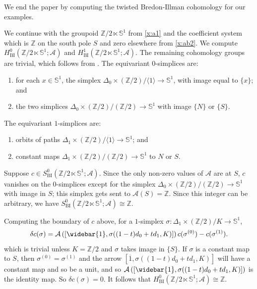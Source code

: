 \documentclass[12pt,reqno]{amsart}
\newcommand{\printname}[1]{}
\renewcommand{\printname}[1]
	{{\color{brown}{\makebox[0pt]{\hspace{-1in}\raisebox{8pt}{\tiny #1}}}}}
\newcommand{\labell}[1]{\label{#1} \printname{#1}}
\newcommand{\zed}{\ensuremath{\mathbb Z}}
\newcommand{\calA}{{\mathcal{A}}}
\renewcommand{\SS}{{\mathbb{S}}} %
\newcommand{\ZZ}{{\mathbb{Z}}}  %
\theoremstyle{plain}
\theoremstyle{definition}
\newenvironment{example}
		{\pushQED{\qed}\renewcommand{\qedsymbol}{$/\!\!/$}\examplex}
		{\popQED\endexamplex}
\newcommand{\BI}{{\operatorname{BI}}} %
\begin{document}
    We end the paper by computing the twisted Bredon-Illman cohomology for our examples.
    
    \begin{example}[{\bf Groupoid A}]\labell{x:a3}
        We continue with the groupoid $\ZZ/2 \ltimes \SS^1$ from \cref{x:a1} and the coefficient system which is $\zed$ on the south pole $S$ and zero elsewhere from \cref{x:ab2}.  We compute $H_\BI^0(\ZZ/2\ltimes\SS^1;\calA)$ and $H_\BI^1(\ZZ/2\ltimes\SS^1;\calA)$.  The remaining cohomology groups are trivial, which follows from \cite[Theorem 7.3]{MuMu}. 
        The equivariant $0$-simplices are:
        \begin{enumerate}
            \item for each $x\in\SS^1$, the simplex $\Delta_0\times(\ZZ/2)/\langle1\rangle\to\SS^1$, with image equal to $\{x\}$; and
            \item the two simplices $\Delta_0\times(\ZZ/2)/(\ZZ/2)\to\SS^1$ with image $\{N\}$ or $\{S\}$.
        \end{enumerate}

        The equivariant $1$-simplices are:
        \begin{enumerate}
            \item orbits of paths $\Delta_1\times(\ZZ/2)/\langle1\rangle\to\SS^1$; and
            \item constant maps $\Delta_1\times(\ZZ/2)/(\ZZ/2)\to\SS^1$ to $N$ or $S$.
        \end{enumerate}

        Suppose $c\in S^0_\BI(\ZZ/2\ltimes\SS^1;\calA)$.  Since the only non-zero values of $\calA$ are at $S$,  $c$ vanishes on the $0$-simplices except for the simplex $\Delta_0\times(\ZZ/2)/(\ZZ/2)\to\SS^1$ with image in $S$;  this simplex gets sent to $\calA(S) = \ZZ$.    Since this integer can be arbitrary, we have $S^0_\BI(\ZZ/2\ltimes\SS^1;\calA)\cong\ZZ$.

        Computing the boundary of $c$ above, for a $1$-simplex $\sigma\colon\Delta_1\times(\ZZ/2)/K\to\SS^1$,
        $$\delta c(\sigma)=\calA\left([\widebar{1},\sigma((1-t)d_0+td_1,K)]\right)c(\sigma^{(0)})-c(\sigma^{(1)}).$$
        which is trivial unless $K=\ZZ/2$ and $\sigma$ takes image in $\{S\}$.  If $\sigma$ is a constant map to $S$, then $\sigma^{(0)}=\sigma^{(1)}$ and  the arrow $[\overline{1},\sigma((1-t)d_0+td_1,K)]$ will have a constant map and so be a unit, and so $\calA\left([\widebar{1},\sigma((1-t)d_0+td_1,K)]\right)$ is the identity map.   So $\delta c(\sigma) = 0$.   It follows that $H_\BI^0(\ZZ/2\ltimes\SS^1;\calA)\cong\ZZ$.


\end{example}
\end{document}
